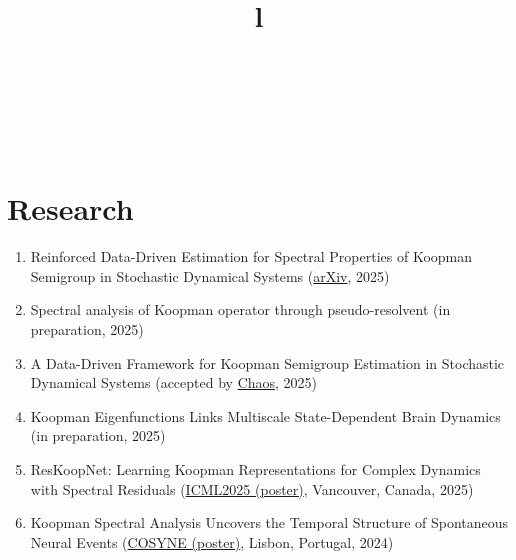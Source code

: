 \documentclass[margin]{res}
\begin{document}
\begin{resume}




\begin{format}
\title{l}\\
\\
\body\\
\end{format}


\section{Research}

\begin{enumerate}
    \item Reinforced Data-Driven Estimation for Spectral Properties of Koopman Semigroup in Stochastic Dynamical Systems (\href{https://arxiv.org/abs/2509.04265}{arXiv}, 2025)
    
    \item Spectral analysis of Koopman operator through pseudo-resolvent (in preparation, 2025)
    
    \item A Data-Driven Framework for Koopman Semigroup Estimation in Stochastic Dynamical Systems (accepted by \href{https://arxiv.org/abs/2501.13301}{Chaos}, 2025) 

    \item Koopman Eigenfunctions Links Multiscale State-Dependent Brain Dynamics (in preparation, 2025)

    \item ResKoopNet: Learning Koopman Representations for Complex Dynamics with Spectral Residuals (\href{https://icml.cc/virtual/2025/poster/45196}{ICML2025 (poster)}, Vancouver, Canada, 2025)

    \item  Koopman Spectral Analysis Uncovers the Temporal Structure of Spontaneous Neural Events (\href{https://static1.squarespace.com/static/6102ca347474c263c40150cd/t/65e1abbdf843e41837fc9c0d/1709288389623/Cosyne2024_program_book.pdf}{COSYNE (poster)}, Lisbon, Portugal, 2024)


\end{enumerate}
\end{resume}
\end{document}
